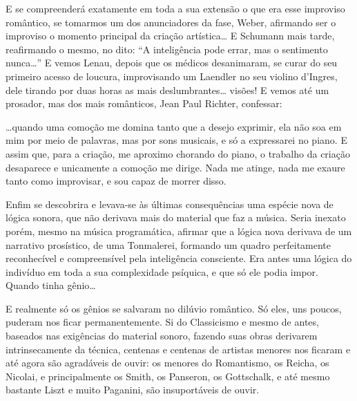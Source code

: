 E se compreenderá exatamente em toda a sua extensão o que era esse
improviso romântico, se tomarmos um dos anunciadores da fase, Weber,
afirmando ser o improviso o momento principal da criação artística\ldots{} E
Schumann mais tarde, reafirmando o mesmo, no dito: ``A inteligência pode
errar, mas o sentimento nunca\ldots{}'' E vemos Lenau, depois que os médicos
desanimaram, se curar do seu primeiro acesso de loucura, improvisando um
Laendler no seu violino d'Ingres, dele tirando por duas horas as mais
deslumbrantes\ldots{} visões! E vemos até um prosador, mas dos mais
românticos, Jean Paul Richter, confessar:

\ldots{}quando uma comoção me domina tanto que a desejo exprimir, ela não soa
em mim por meio de palavras, mas por sons musicais, e só a expressarei
no piano. E assim que, para a criação, me aproximo chorando do piano, o
trabalho da criação desaparece e unicamente a comoção me dirige. Nada me
atinge, nada me exaure tanto como improvisar, e sou capaz de morrer
disso.

Enfim se descobrira e levava-se às últimas consequências uma espécie
nova de lógica sonora, que não derivava mais do material que faz a
música. Seria inexato porém, mesmo na música programática, afirmar que a
lógica nova derivava de um narrativo prosístico, de uma Tonmalerei,
formando um quadro perfeitamente reconhecível e compreensível pela
inteligência consciente. Era antes uma lógica do indivíduo em toda a sua
complexidade psíquica, e que só ele podia impor. Quando tinha gênio\ldots{}

E realmente só os gênios se salvaram no dilúvio romântico. Só eles, uns
poucos, puderam nos ficar permanentemente. Si do Classicismo e mesmo de
antes, baseados nas exigências do material sonoro, fazendo suas obras
derivarem intrinsecamente da técnica, centenas e centenas de artistas
menores nos ficaram e até agora são agradáveis de ouvir: os menores do
Romantismo, os Reicha, os Nicolai, e principalmente os Smith, os
Panseron, os Gottschalk, e até mesmo bastante Liszt e muito Paganini,
são insuportáveis de ouvir.


